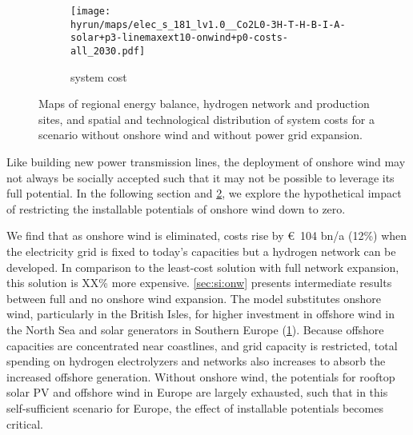 \begin{figure}
    \centering
    \begin{subfigure}[t]{0.6\textwidth}
        \centering
        \caption{system cost}
        \texttt{[image: \\hyrun/maps/elec\_s\_181\_lv1.0\_\_Co2L0-3H-T-H-B-I-A-solar+p3-linemaxext10-onwind+p0-costs-all\_2030.pdf]}
        \label{fig:no-onw:tsc}
    \end{subfigure}
    \caption{Maps of regional energy balance, hydrogen network and production sites, and spatial and technological distribution of system costs for a scenario without onshore wind and without power grid expansion.}
    \label{fig:no-onw}
\end{figure}


Like building new power transmission lines, the deployment of onshore wind may
not always be socially accepted such that it may not be possible to leverage its
full potential. In the following section and \cref{fig:no-onw}, we explore the
hypothetical impact of restricting the installable potentials of onshore wind
down to zero.

We find that as onshore wind is eliminated, costs rise by \euro~104 bn/a (12\%)
when the electricity grid is fixed to today's capacities but a hydrogen network
can be developed. In comparison to the least-cost solution with full network
expansion, this solution is XX\% more expensive. \cref{sec:si:onw} presents
intermediate results between full and no onshore wind expansion. The model
substitutes onshore wind, particularly in the British Isles, for higher
investment in offshore wind in the North Sea and solar generators in Southern
Europe (\cref{fig:no-onw:tsc}). Because offshore capacities are concentrated
near coastlines, and grid capacity is restricted, total spending on hydrogen
electrolyzers and networks also increases to absorb the increased offshore
generation. Without onshore wind, the potentials for rooftop solar PV and
offshore wind in Europe are largely exhausted, such that in this self-sufficient
scenario for Europe, the effect of installable potentials becomes critical.

